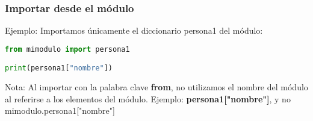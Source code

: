 \begin{frame}[fragile]
  \frametitle{Importar desde el módulo}

  \begin{exampleblock}{Ejemplo:}
    Importamos únicamente el diccionario persona1 del módulo:
    \begin{lstlisting}[language=Python]
from mimodulo import persona1

print(persona1["nombre"])
    \end{lstlisting}
  \end{exampleblock}
  \begin{alertblock}{Nota:}
    Al importar con la palabra clave \textbf{from}, no utilizamos
    el nombre del módulo al referirse a los elementos del módulo.
    Ejemplo: \textbf{persona1["nombre"]}, y no mimodulo.persona1["nombre"]
  \end{alertblock}
\end{frame}
